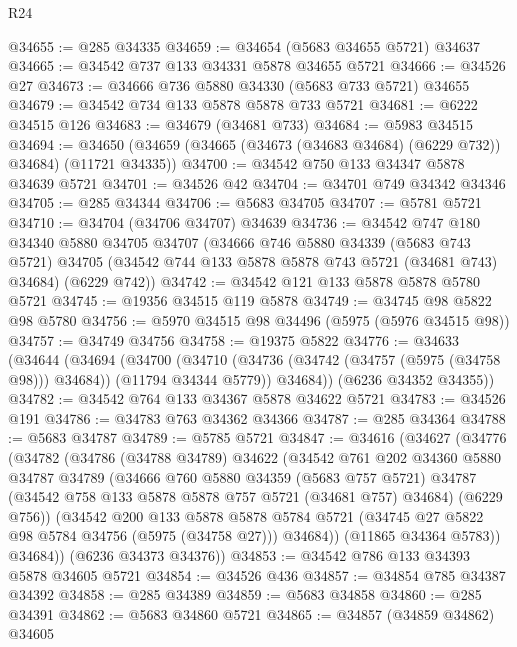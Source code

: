 \begin{lexlean}{R24}
\begin{coremodule}
@34655 := @285 @34335
@34659 := @34654 (@5683 @34655 @5721) @34637
@34665 := @34542 @737 @133 @34331 @5878 @34655 @5721
@34666 := @34526 @27
@34673 := @34666 @736 @5880 @34330 (@5683 @733 @5721) @34655
@34679 := @34542 @734 @133 @5878 @5878 @733 @5721
@34681 := @6222 @34515 @126
@34683 := @34679 (@34681 @733)
@34684 := @5983 @34515
@34694 := @34650 (@34659 (@34665 (@34673 (@34683 @34684) (@6229 @732)) @34684) (@11721 @34335))
@34700 := @34542 @750 @133 @34347 @5878 @34639 @5721
@34701 := @34526 @42
@34704 := @34701 @749 @34342 @34346
@34705 := @285 @34344
@34706 := @5683 @34705
@34707 := @5781 @5721
@34710 := @34704 (@34706 @34707) @34639
@34736 := @34542
    @747
    @180
    @34340
    @5880
    @34705
    @34707
    (@34666
      @746
      @5880
      @34339
      (@5683 @743 @5721)
      @34705
      (@34542 @744 @133 @5878 @5878 @743 @5721 (@34681 @743) @34684)
      (@6229 @742))
@34742 := @34542 @121 @133 @5878 @5878 @5780 @5721
@34745 := @19356 @34515 @119 @5878
@34749 := @34745 @98 @5822 @98 @5780
@34756 := @5970 @34515 @98 @34496 (@5975 (@5976 @34515 @98))
@34757 := @34749 @34756
@34758 := @19375 @5822
@34776 := @34633
    (@34644
      (@34694
        (@34700
          (@34710 (@34736 (@34742 (@34757 (@5975 (@34758 @98))) @34684)) (@11794 @34344 @5779))
          @34684))
      (@6236 @34352 @34355))
@34782 := @34542 @764 @133 @34367 @5878 @34622 @5721
@34783 := @34526 @191
@34786 := @34783 @763 @34362 @34366
@34787 := @285 @34364
@34788 := @5683 @34787
@34789 := @5785 @5721
@34847 := @34616
    (@34627
      (@34776
        (@34782
          (@34786
            (@34788 @34789)
            @34622
            (@34542
              @761
              @202
              @34360
              @5880
              @34787
              @34789
              (@34666
                @760
                @5880
                @34359
                (@5683 @757 @5721)
                @34787
                (@34542 @758 @133 @5878 @5878 @757 @5721 (@34681 @757) @34684)
                (@6229 @756))
              (@34542
                @200
                @133
                @5878
                @5878
                @5784
                @5721
                (@34745 @27 @5822 @98 @5784 @34756 (@5975 (@34758 @27)))
                @34684))
            (@11865 @34364 @5783))
          @34684))
      (@6236 @34373 @34376))
@34853 := @34542 @786 @133 @34393 @5878 @34605 @5721
@34854 := @34526 @436
@34857 := @34854 @785 @34387 @34392
@34858 := @285 @34389
@34859 := @5683 @34858
@34860 := @285 @34391
@34862 := @5683 @34860 @5721
@34865 := @34857 (@34859 @34862) @34605

\end{coremodule}
\end{lexlean}
